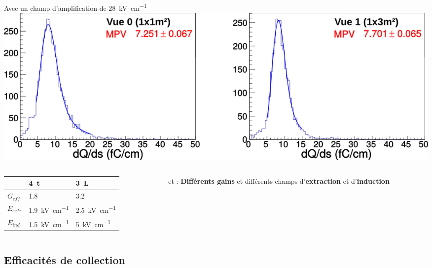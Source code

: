     \begin{frame}{Avec un champ d'amplification de \SI{28}{\kilo\volt\per\centi\meter}}
        \includegraphics[width=\textwidth]{./pictures/dQds_840.png}\\\vfill
        \begin{columns}
            \begin{column}{0.55\textwidth}
                \begin{tabular}{l|l|l|}
                \cline{2-3}
                 & \SI{4}{\tonne} & \SI{3}{\liter} \\ \hline
                \multicolumn{1}{|l|}{$G_{eff}$} & 1.8 & 3.2 \\
                \multicolumn{1}{|l|}{$E_{extr}$} & \SI{1.9}{\kilo\volt\per\centi\meter} & \SI{2.5}{\kilo\volt\per\centi\meter} \\
                \multicolumn{1}{|l|}{$E_{ind}$} & \SI{1.5}{\kilo\volt\per\centi\meter} & \SI{5}{\kilo\volt\per\centi\meter} \\ \hline
                \end{tabular}
            \end{column}
            \begin{column}{0.45\textwidth}
                \begin{scriptsize}
                \TOO{} et \threeL{} : \textbf{Différents gains} et
                différents champs d'\textbf{extraction} et d'\textbf{induction}\\
                \end{scriptsize}
            \end{column}
        \end{columns}
    \end{frame}

    \subsection[Efficacités de collection]{Efficacités de collection}

